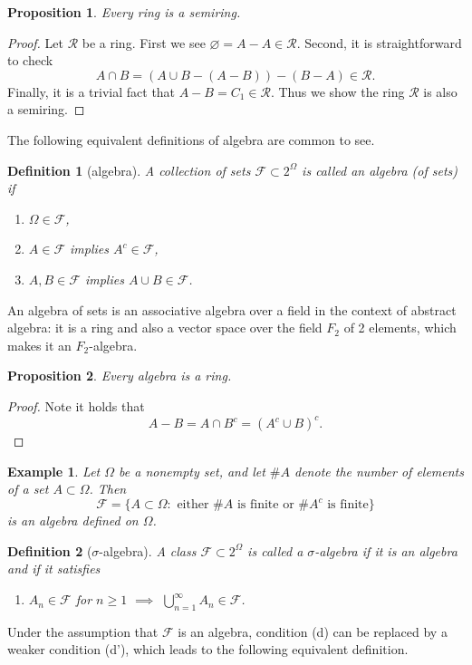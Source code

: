 \documentclass{report}
\newtheorem{definition}{Definition}[section]
\newtheorem{example}{Example}[section]
\newtheorem{proposition}{Proposition}[section]
\theoremstyle{nonumberplain}
\newtheorem{proof}{Proof.}
\begin{document}
\begin{proposition}
	Every ring is a semiring.
\end{proposition}
\begin{proof}
	Let $\mathcal{R}$ be a ring. First we see $\varnothing=A-A\in \mathcal{R}$. Second, it is straightforward to check
	$$A\cap B=(A\cup B-(A-B))-(B-A)\in\mathcal{R}.$$
	Finally, it is a trivial fact that $A-B=C_1\in\mathcal{R}$. Thus we show the ring $\mathcal{R}$ is also a semiring.
\end{proof}
The following equivalent definitions of algebra are common to see.
\begin{definition}[algebra]
	A collection of sets $\mathcal{F}\subset 2^{\Omega}$ is called an  \emph{algebra (of sets)} if
	\begin{enumerate}
		\item [(a)] $\Omega\in\mathcal{F}$, 
		\item [(b)] $A \in\mathcal{F}$ implies $A^c\in\mathcal{F}$, 
		\item [(c)] $A,B\in\mathcal{F}$ implies $A\cup B\in\mathcal{F}$.
	\end{enumerate}
\end{definition}
An algebra of sets is an associative algebra over a field in the context of abstract algebra: it is a ring and also a vector space over the field $F_2$ of 2 elements, which makes it an $F_2$-algebra. 

\begin{proposition}
	Every algebra is a ring.
\end{proposition}
\begin{proof}
	Note it holds that 
	\[
	A-B=A\cap B^c=(A^c\cup B)^c.
	\]
\end{proof}

\begin{example}
	Let $\Omega$ be a nonempty set, and let $\#A$ denote the number of elements of a set $A\subset\Omega$. Then
	\[
	\mathcal{F} = \{A\subset \Omega : \text{ either }\#A\text{ is finite or }\#A^c\text{ is finite}\}
	\]
	is an algebra defined on $\Omega$.
\end{example}

\begin{definition}[$\sigma$-algebra]
A class $\mathcal{F}\subset 2^{\Omega}$ is called a \emph{$\sigma$-algebra} if it is an algebra and if it satisfies
\begin{enumerate}
	\item [(d)] $A_n\in\mathcal{F}$ for $n\ge 1$ $\implies$ $\bigcup\limits_{n=1}^\infty A_n\in\mathcal{F}$.
\end{enumerate}
\end{definition}
Under the assumption that $\mathcal{F}$ is an algebra, condition (d) can be replaced by a weaker condition (d'), which leads to the following equivalent definition.
\end{document}
